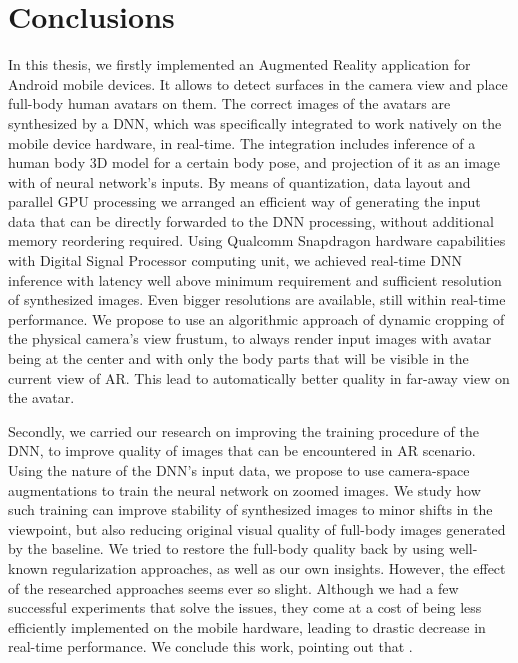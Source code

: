\chapter{Conclusions}\label{chapter:conclusions}

In this thesis, we firstly implemented an Augmented Reality application for Android mobile devices. It allows to detect surfaces in the camera view and place full-body human avatars on them. The correct images of the avatars are synthesized by a DNN, which was specifically integrated to work natively on the mobile device hardware, in real-time. The integration includes inference of a human body 3D model for a certain body pose, and projection of it as an image with of neural network's inputs. By means of quantization, data layout and parallel GPU processing we arranged an efficient way of generating the input data that can be directly forwarded to the DNN processing, without additional memory reordering required. Using Qualcomm Snapdragon hardware capabilities with Digital Signal Processor computing unit, we achieved real-time DNN inference with latency well above minimum requirement and sufficient resolution of synthesized images. Even bigger resolutions are available, still within real-time performance. We propose to use an algorithmic approach of dynamic cropping of the physical camera's view frustum, to always render input images with avatar being at the center and with only the body parts that will be visible in the current view of AR. This lead to automatically better quality in far-away view on the avatar.

Secondly, we carried our research on improving the training procedure of the DNN, to improve quality of images that can be encountered in AR scenario. Using the nature of the DNN's input data, we propose to use camera-space augmentations to train the neural network on zoomed images. We study how such training can improve stability of synthesized images to minor shifts in the viewpoint, but also reducing original visual quality of full-body images generated by the baseline. We tried to restore the full-body quality back by using well-known regularization approaches, as well as our own insights. However, the effect of the researched approaches seems ever so slight. Although we had a few successful experiments that solve the issues, they come at a cost of being less efficiently implemented on the mobile hardware, leading to drastic decrease in real-time performance. We conclude this work, pointing out that .



